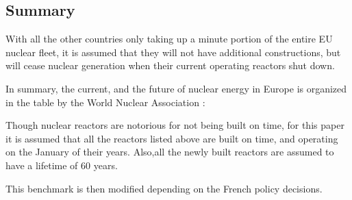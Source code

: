 \subsection{Summary}
With all the other countries only taking up a minute portion of the entire
EU nuclear fleet, it is assumed that they will not have additional constructions,
but will cease nuclear generation when their current operating reactors shut down.

In summary, the current, and the future of nuclear energy in Europe is organized
in the table by the World Nuclear Association \cite{world_nuclear_association_nuclear_2017}:

\begin{table}[h]
	\centering
	\caption {Power Reactors under construction and planned \cite{world_nuclear_association_nuclear_2017}}
\end{table}

Though nuclear reactors are notorious for not being built on time,
for this paper it is assumed that all the reactors listed above are built
on time, and operating on the January of their years. Also,all the newly
built reactors are assumed to have a lifetime of 60 years.

This benchmark is then modified depending on the French policy decisions.